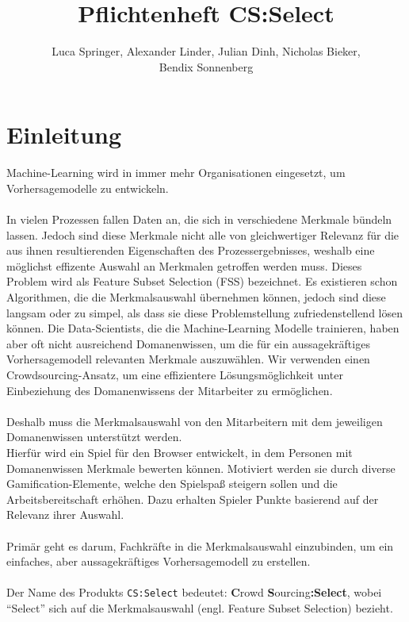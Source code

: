 \documentclass[a4paper]{scrreprt}
\begin{document}
    \title{Pflichtenheft CS:Select}
    \author{Luca Springer, Alexander Linder, Julian Dinh, Nicholas Bieker,\\ Bendix Sonnenberg}
    \maketitle

    \tableofcontents

    \chapter{Einleitung}
    Machine-Learning wird in immer mehr Organisationen eingesetzt, um Vorhersagemodelle zu entwickeln.\\\\
    In vielen Prozessen fallen Daten an, die sich in verschiedene Merkmale bündeln lassen.
    Jedoch sind diese Merkmale nicht alle von gleichwertiger Relevanz für die aus ihnen resultierenden Eigenschaften des Prozessergebnisses, weshalb eine möglichst effizente Auswahl an Merkmalen getroffen werden muss.
    Dieses Problem wird als Feature Subset Selection (FSS) bezeichnet.
    Es existieren schon Algorithmen, die die Merkmalsauswahl übernehmen können, jedoch sind diese langsam oder zu simpel, als dass sie diese Problemstellung zufriedenstellend lösen können.
    Die Data-Scientists, die die Machine-Learning Modelle trainieren, haben aber oft nicht ausreichend \Gls{Domanenwissen}, um die für ein aussagekräftiges Vorhersagemodell relevanten Merkmale auszuwählen.
    Wir verwenden einen Crowdsourcing-Ansatz, um eine effizientere Lösungsmöglichkeit unter Einbeziehung des \Gls{Domanenwissen}s der Mitarbeiter zu ermöglichen.\\\\
    Deshalb muss die Merkmalsauswahl von den Mitarbeitern mit dem jeweiligen \Gls{Domanenwissen} unterstützt werden.\\
    Hierfür wird ein Spiel für den Browser entwickelt, in dem Personen mit \Gls{Domanenwissen} Merkmale bewerten können.
    Motiviert werden sie durch diverse Gamification-Elemente, welche den Spielspaß steigern sollen und die Arbeitsbereitschaft erhöhen.
    Dazu erhalten Spieler Punkte basierend auf der Relevanz ihrer Auswahl.\\\\
    Primär geht es darum, Fachkräfte in die Merkmalsauswahl einzubinden, um ein einfaches, aber aussagekräftiges Vorhersagemodell zu erstellen.\\\\
    Der Name des Produkts \texttt{CS:Select} bedeutet: \textbf{C}rowd \textbf{S}ourcing\textbf{:Select}, wobei \enquote{Select} sich auf die Merkmalsauswahl (engl. Feature Subset Selection) bezieht.
\end{document}
